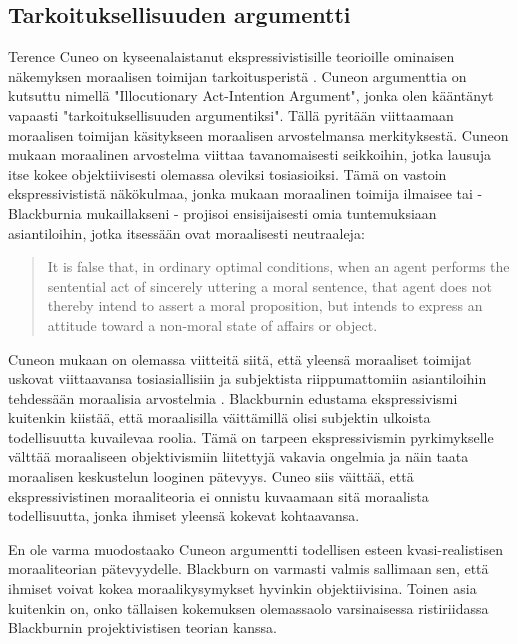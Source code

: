 \documentclass[a4paper,12pt,times,titlepage,finnish]{article}
\begin{document}
\subsection{Tarkoituksellisuuden argumentti}

Terence Cuneo on kyseenalaistanut ekspressivistisille teorioille ominaisen nä\-ke\-myk\-sen moraalisen toimijan tarkoitusperistä \citep[ks.][]{Cuneo06}. Cuneon argumenttia on kutsuttu nimellä "Illocutionary Act-Intention Argument", jonka olen kääntänyt vapaasti "tarkoituksellisuuden argumentiksi". Tällä pyritään viittaamaan moraalisen toimijan käsitykseen moraalisen arvostelmansa merkityksestä. 
Cuneon mukaan moraalinen arvostelma viittaa tavanomaisesti seikkoihin, jotka lausuja itse kokee objektiivisesti  olemassa oleviksi tosiasioiksi. Tä\-mä on vastoin ekspressivististä näkökulmaa, jonka mukaan moraalinen toimija ilmaisee tai - Blackburnia mukaillakseni - projisoi ensisijaisesti omia tuntemuksiaan asiantiloihin, jotka itsessään ovat moraalisesti neutraaleja:

\begin{quote}
It is false that, in ordinary optimal conditions, when an agent performs the sentential act of sincerely uttering a moral sentence, that agent does not thereby intend to assert a moral proposition, but intends to express an attitude toward a non-moral state of affairs or object. \citep[67]{Cuneo06}
\end{quote}

Cuneon mukaan on olemassa viitteitä siitä, että yleensä moraaliset toimijat uskovat viittaavansa tosiasiallisiin ja subjektista riippumattomiin asiantiloihin teh\-des\-sään moraalisia arvostelmia \citep[ks.][]{cognitivismSE}. Blackburnin edustama ekspressivismi kuitenkin kiis\-tää, että moraalisilla väittämillä olisi subjektin ulkoista todellisuutta kuvailevaa roolia. Tä\-mä on tarpeen ekspressivismin pyrkimykselle välttää moraaliseen objektivismiin liitettyjä vakavia ongelmia ja näin taata moraalisen keskustelun looginen pätevyys. Cuneo siis väittää, että ekspressivistinen moraaliteoria ei onnistu kuvaamaan sitä moraalista todellisuutta, jonka ihmiset yleensä kokevat kohtaavansa. 

En ole varma muodostaako Cuneon argumentti todellisen esteen kvasi-realistisen moraaliteorian pätevyydelle. Blackburn on varmasti valmis sallimaan sen, että ihmiset voivat kokea moraalikysymykset hyvinkin objektiivisina. Toinen asia kuitenkin on, onko tällaisen kokemuksen olemassaolo varsinaisessa ristiriidassa Blackburnin projektivistisen teorian kanssa.
\end{document}
